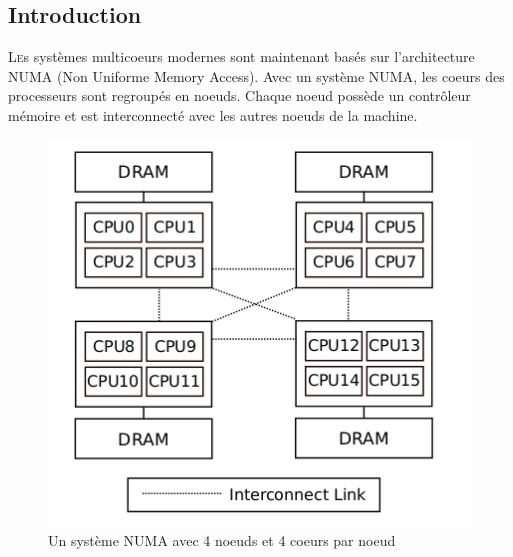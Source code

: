 \subsection{Introduction}

  \lettrine[nindent=0em,lines=3]{L} es systèmes multicoeurs modernes sont
  maintenant basés sur l'architecture NUMA (Non Uniforme Memory Access). Avec un
  système NUMA, les coeurs des processeurs sont regroupés en noeuds. Chaque
  noeud possède un contrôleur mémoire et est interconnecté avec les autres
  noeuds de la machine.

  \begin{figure}[H]
    \begin{center}
      \includegraphics[scale=0.4]{img/numa_arch.png}
      \caption{Un système NUMA avec 4 noeuds et 4 coeurs par noeud}
      \label{f:numa_arch}
    \end{center}
  \end{figure}

